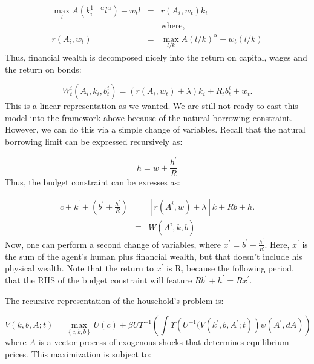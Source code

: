 \documentclass{article}
\begin{document}
\begin{eqnarray*}
\max_{l}A\left( k_{i}^{1-\alpha }l^{\alpha }\right) -w_{t}l &=&r\left(
A_{i},w_{t}\right) k_{i} \\
&&\text{where,} \\
r\left( A_{i},w_{t}\right) &=&\max_{l/k}A\left( l/k\right) ^{\alpha
}-w_{t}\left( l/k\right)
\end{eqnarray*}%
Thus, financial wealth is decomposed nicely into the return on capital,
wages and the return on bonds:

\begin{equation*}
W_{t}^{i}\left( A_{i},k_{i},b_{t}^{i}\right) =\left( r\left(
A_{i},w_{t}\right) +\lambda \right) k_{i}+R_{t}b_{t}^{i}+w_{t}.
\end{equation*}%
This is a linear representation as we wanted. We are still not ready to cast
this model into the framework above because of the natural borrowing
constraint. However, we can do this via a simple change of variables. Recall
that the natural borrowing limit can be expressed recursively as:

\begin{equation*}
h=w+\frac{h^{\prime }}{R}
\end{equation*}%
Thus, the budget constraint can be exresses as:

\begin{eqnarray*}
c+k^{^{\prime }}+\left( b^{\prime }+\frac{h^{\prime }}{R}\right) &=&\left[
r\left( A^{i},w\right) +\lambda \right] k+Rb+h. \\
&\equiv &W\left( A^{i},k,b\right)
\end{eqnarray*}%
Now, one can perform a second change of variables, where $x^{\prime
}=b^{\prime }+\frac{h^{\prime }}{R}.$ Here, $x^{\prime }$ is the sum of the
agent's human plus financial wealth, but that doesn't include his physical
wealth. Note that the return to $x^{\prime }$ is R, because the following
period, that the RHS of the budget constraint will feature $Rb^{\prime
}+h^{\prime }=Rx^{\prime }$.

The recursive representation of the household's problem is:

\begin{equation}
V\left( k,b,A;t\right) =\max_{\left\{ c,k,b\right\} }U\left( c\right) +\beta
U\Upsilon ^{-1}\left( \int \Upsilon \left( U^{-1}(V\left( k^{\prime
},b,A^{\prime };t\right) \right) \psi \left( A^{\prime },dA\right) \right)
\label{2}
\end{equation}%
where $A$ is a vector process of exogenous shocks that determines
equilibrium prices. This maximization is subject to:
\end{document}
